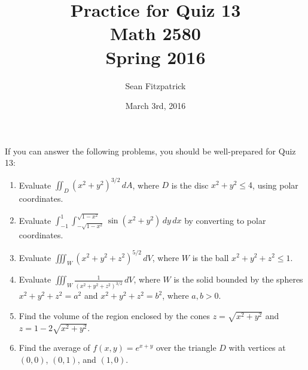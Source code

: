 \documentclass[letterpaper,12pt]{article}
\title{Practice for Quiz 13\\Math 2580\\Spring 2016}
\author{Sean Fitzpatrick}
\date{March 3rd, 2016}
\begin{document}
 \maketitle

If you can answer the following problems, you should be well-prepared for Quiz 13:



\begin{enumerate}
 \item Evaluate $\iint_D(x^2+y^2)^{3/2}\,dA$, where $D$ is the disc $x^2+y^2\leq 4$, using polar coordinates.
 \item Evaluate $\int_{-1}^1\int_{-\sqrt{1-x^2}}^{\sqrt{1-x^2}}\sin(x^2+y^2)\,dy\,dx$ by converting to polar coordinates.
 \item Evaluate $\iiint_W (x^2+y^2+z^2)^{5/2}\,dV$, where $W$ is the ball $x^2+y^2+z^2\leq 1$.
 \item Evaluate $\iiint_W \frac{1}{(x^2+y^2+z^2)^{3/2}}\,dV$, where $W$ is the solid bounded by the spheres $x^2+y^2+z^2=a^2$ and $x^2+y^2+z^2=b^2$, where $a,b>0$.
 \item Find the volume of the region enclosed by the cones $z=\sqrt{x^2+y^2}$ and $z=1-2\sqrt{x^2+y^2}$.
 \item Find the average of $f(x,y)=e^{x+y}$ over the triangle $D$ with vertices at $(0,0)$, $(0,1)$, and $(1,0)$.
 \end{enumerate}
\end{document}
